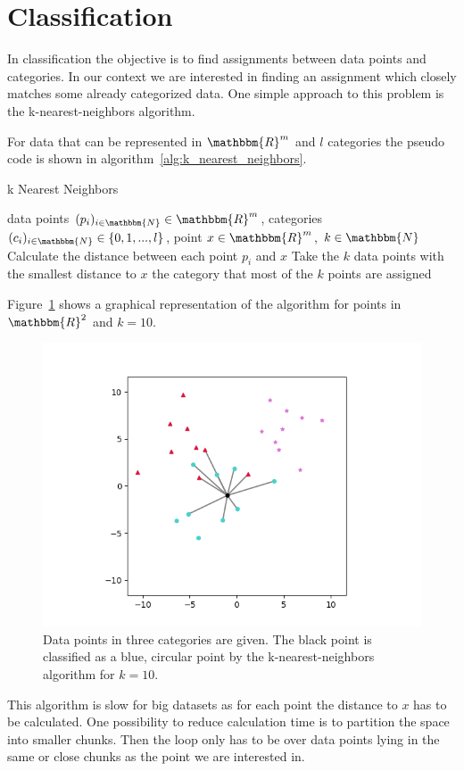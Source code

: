 \newpage

\section{Classification}
\label{sec:classification}

In classification the objective is to find assignments between data points and categories. In our context we are interested in finding an assignment which closely matches some already categorized data. One simple approach to this problem is the k-nearest-neighbors algorithm.

For data that can be represented in $\mathbbm{R}^m$ and $l$ categories the pseudo code is shown in algorithm~\ref{alg:k_nearest_neighbors}.

\begin{algorithm}
	\caption{k Nearest Neighbors}\label{alg:k_nearest_neighbors}
	\begin{algorithmic}
		\Require data points $(p_i)_{i \in \mathbbm{N}} \in \mathbbm{R}^{m}$, categories $(c_i)_{i \in \mathbbm{N}} \in \{0, 1, ..., l\}$, point $x \in \mathbbm{R}^{m}$, $k \in \mathbbm{N}$
		\State Calculate the distance between each point $p_i$ and $x$
		\State Take the $k$ data points with the smallest distance to $x$
		\State \Return the category that most of the $k$ points are assigned
	\end{algorithmic}
\end{algorithm}

Figure~\ref{fig:k_nearest_neighbors} shows a graphical representation of the algorithm for points in $\mathbbm{R}^2$ and $k=10$.

\begin{figure}
	\centering
	\includegraphics[width=0.8\linewidth]{figs/k_nearest_neighbors}
	\caption{Data points in three categories are given. The black point is classified as a blue, circular point by the k-nearest-neighbors algorithm for $k=10$.}
	\label{fig:k_nearest_neighbors}
\end{figure}

This algorithm is slow for big datasets as for each point the distance to $x$ has to be calculated. One possibility to reduce calculation time is to partition the space into smaller chunks. Then the loop only has to be over data points lying in the same or close chunks as the point we are interested in.
